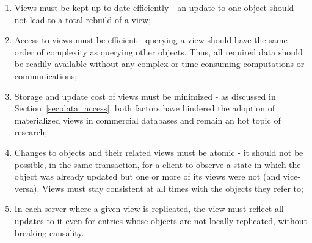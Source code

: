 \begin{enumerate}
	\item Views must be kept up-to-date efficiently - an update to one object should not lead to a total rebuild of a view; 
	\item Access to views must be efficient - querying a view should have the same order of complexity as querying other objects.
	Thus, all required data should be readily available without any complex or time-consuming computations or communications;
	\item Storage and update cost of views must be minimized - as discussed in Section~\ref{sec:data_access}, both factors have hindered the adoption of materialized views in commercial databases and remain an hot topic of research;
	\item \label{item:objviewconsistency} Changes to objects and their related views must be atomic - it should not be possible, in the same transaction, for a client to observe a state in which the object was already updated but one or more of its views were not (and vice-versa). Views must stay consistent at all times with the objects they refer to;
	\item In each server where a given view is replicated, the view must reflect all updates to it even for entries whose objects are not locally replicated, without breaking causality.
\end{enumerate}


